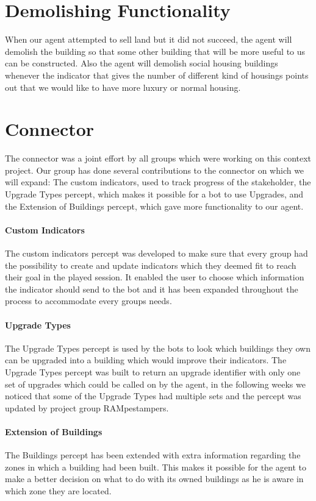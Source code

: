 \section{Demolishing Functionality}
When our agent attempted to sell land but it did not succeed, the agent will demolish the building so that some other building that will be more useful to us can be constructed. Also the agent will demolish social housing buildings whenever the indicator that gives the number of different kind of housings points out that we would like to have more luxury or normal housing. 

\section{Connector} 
The connector was a joint effort by all groups which were working on this context project. Our group has done several contributions to the connector on which we will expand: The custom indicators, used to track progress of the stakeholder, the Upgrade Types percept, which makes it possible for a bot to use Upgrades, and the Extension of Buildings percept, which gave more functionality to our agent.

\paragraph{Custom Indicators}
The custom indicators percept was developed to make sure that every group had the possibility to create and update indicators which they deemed fit to reach their goal in the played session. It enabled the user to choose which information the indicator should send to the bot and it has been expanded throughout the process to accommodate every groups needs.

\paragraph{Upgrade Types}
The Upgrade Types percept is used by the bots to look which buildings they own can be upgraded into a building which would improve their indicators. The Upgrade Types percept was built to return an upgrade identifier with only one set of upgrades which could be called on by the agent, in the following weeks we noticed that some of the Upgrade Types had multiple sets and the percept was updated by project group RAMpestampers.

\paragraph{Extension of Buildings}
The Buildings percept has been extended with extra information regarding the zones in which a building had been built. This makes it possible for the agent to make a better decision on what to do with its owned buildings as he is aware in which zone they are located.